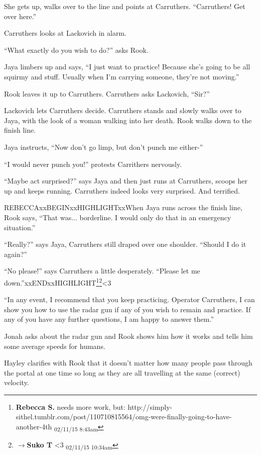 She gets up, walks over to the line and points at Carruthers.  ``Carruthers!  Get over here.''

Carruthers looks at Lackovich in alarm.

``What exactly do you wish to do?'' asks Rook.

Jaya limbers up and says, ``I just want to practice!  Because she's going to be all squirmy and stuff.  Usually when I'm carrying someone, they're not moving.''

Rook leaves it up to Carruthers.  Carruthers asks Lackovich, ``Sir?''

Lackovich lets Carruthers decide.  Carruthers stands and slowly walks over to Jaya, with the look of a woman walking into her death.  Rook walks down to the finish line.

Jaya instructs, ``Now don't go limp, but don't punch me either-''

``I would never punch you!'' protests Carrithers nervously.

``Maybe act surprised?'' says Jaya and then just runs at Carruthers, scoops her up and keeps running.  Carruthers indeed looks very surprised.  And terrified.

REBECCAxxBEGINxxHIGHLIGHTxxWhen Jaya runs across the finish line, Rook says, ``That was... borderline.  I would only do that in an emergency situation.''

``Really?'' says Jaya, Carruthers still draped over one shoulder.  ``Should I do it again?''

``No please!'' says Carruthers a little desperately.  ``Please let me down.''xxENDxxHIGHLIGHT\footnote{\textbf{Rebecca S. }needs more work, but: http://simply-sithel.tumblr.com/post/110710815564/omg-were-finally-going-to-have-another-4th \textsubscript{02/11/15 8:43am}}\footnote{$\rightarrow$\textbf{Suko T }\textless 3 \textsubscript{02/11/15 10:34am}}\textless 3

``In any event, I recommend that you keep practicing.  Operator Carruthers, I can show you how to use the radar gun if any of you wish to remain and practice.  If any of you have any further questions, I am happy to answer them.''



Jonah asks about the radar gun and Rook shows him how it works and tells him some average speeds for humans.

Hayley clarifies with Rook that it doesn't matter how many people pass through the portal at one time so long as they are all travelling at the same (correct) velocity.

